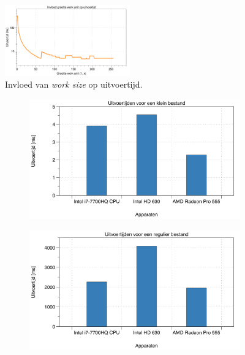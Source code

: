 \documentclass[twocolumn, a4paper]{article}
\begin{document}
\begin{figure}
    \centering
    \includegraphics[width=0.48\textwidth]{data/execution-time.png}
    \caption{Invloed van \emph{work size} op uitvoertijd.}\label{fig:output-one}
\end{figure}

\begin{figure}
    \centering
    \begin{subfigure}{0.48\textwidth}
        \includegraphics[width=\textwidth]{data/klein.png}
    \end{subfigure}
    \begin{subfigure}{0.48\textwidth}
        \includegraphics[width=\textwidth]{data/normaal.png}
    \end{subfigure}

\end{figure}
\end{document}
